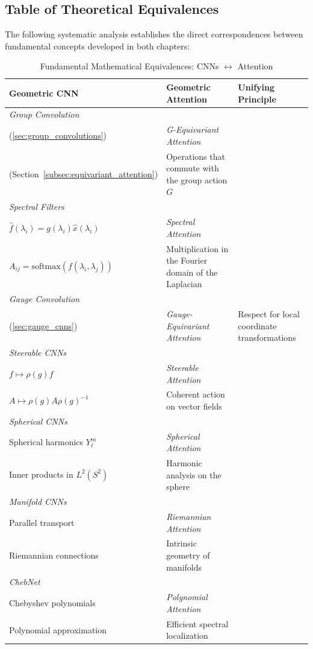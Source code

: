 \subsection{Table of Theoretical Equivalences}\label{subsec:tabla_equivalencias}

The following systematic analysis establishes the direct correspondences between fundamental concepts developed in both chapters:

\begin{table}[H]
\centering
\caption{Fundamental Mathematical Equivalences: CNNs $\leftrightarrow$ Attention}
\label{tab:cnn_attention_equivalencias_fundamentales}
\begin{tabular}{|p{}|p{}|p{}|}
\hline
\textbf{Geometric CNN} & \textbf{Geometric Attention} & \textbf{Unifying Principle} \\
\hline\hline
\textit{Group Convolution} \\
(\autoref{sec:group_convolutions}) & \textit{G-Equivariant Attention} \\
(Section~\ref{subsec:equivariant_attention}) & Operations that commute with the group action $G$ \\
\hline
\textit{Spectral Filters} \\
$\hat{f}(\lambda_i) = g(\lambda_i) \hat{x}(\lambda_i)$ & \textit{Spectral Attention} \\
$A_{ij} = \text{softmax}(f(\lambda_i, \lambda_j))$ & Multiplication in the Fourier domain of the Laplacian \\
\hline
\textit{Gauge Convolution} \\
(\autoref{sec:gauge_cnns}) & \textit{Gauge-Equivariant Attention} & Respect for local coordinate transformations \\
\hline
\textit{Steerable CNNs} \\
$f \mapsto \rho(g) f$ & \textit{Steerable Attention} \\
$A \mapsto \rho(g) A \rho(g)^{-1}$ & Coherent action on vector fields \\
\hline
\textit{Spherical CNNs} \\
Spherical harmonics $Y_\ell^m$ & \textit{Spherical Attention} \\
Inner products in $L^2(S^2)$ & Harmonic analysis on the sphere \\
\hline
\textit{Manifold CNNs} \\
Parallel transport & \textit{Riemannian Attention} \\
Riemannian connections & Intrinsic geometry of manifolds \\
\hline
\textit{ChebNet} \\
Chebyshev polynomials & \textit{Polynomial Attention} \\
Polynomial approximation & Efficient spectral localization \\
\hline
\end{tabular}
\end{table}

